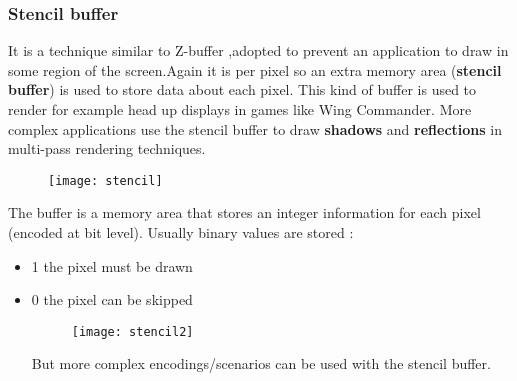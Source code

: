 \subsubsection{Stencil buffer}
It is a technique similar to Z-buffer ,adopted to prevent an application to draw in some region of the screen.Again it is per pixel so an extra memory area (\textbf{stencil buffer}) is used to store data about each pixel. This kind of buffer is used to render for example head up displays in games like Wing Commander. More complex applications use the stencil buffer  to draw \textbf{shadows} and \textbf{reflections} in multi-pass rendering techniques.\\
\begin{figure}[H]
  \centering
  \texttt{[image: stencil]}
\end{figure}
The buffer is a memory area that stores an integer information for each pixel (encoded at bit level). Usually binary values are stored :
\begin{itemize}
\item 1 the pixel must be drawn
\item 0 the pixel can be skipped
\begin{figure}[H]
  \centering
  \texttt{[image: stencil2]}
\end{figure}
But more complex encodings/scenarios can be used with the stencil buffer. 
\end{itemize}